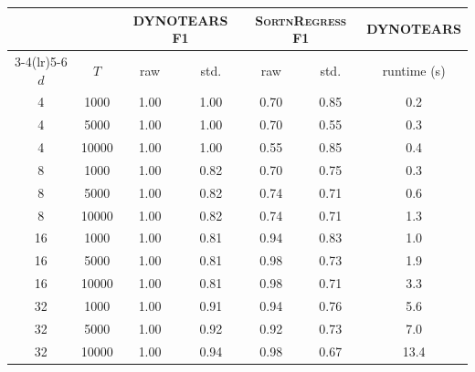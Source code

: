 \begin{tabular}{ccccccc}
\toprule
& & \multicolumn{2}{c}{DYNOTEARS F1} & \multicolumn{2}{c}{\textsc{SortnRegress} F1} & DYNOTEARS \\
\cmidrule(lr){3-4}\cmidrule(lr){5-6}
$d$ & $T$ & raw & std. & raw & std. & runtime (s) \\
\midrule
4 & 1000 & 1.00 & 1.00 & 0.70 & 0.85 & 0.2 \\
4 & 5000 & 1.00 & 1.00 & 0.70 & 0.55 & 0.3 \\
4 & 10000 & 1.00 & 1.00 & 0.55 & 0.85 & 0.4 \\
8 & 1000 & 1.00 & 0.82 & 0.70 & 0.75 & 0.3 \\
8 & 5000 & 1.00 & 0.82 & 0.74 & 0.71 & 0.6 \\
8 & 10000 & 1.00 & 0.82 & 0.74 & 0.71 & 1.3 \\
16 & 1000 & 1.00 & 0.81 & 0.94 & 0.83 & 1.0 \\
16 & 5000 & 1.00 & 0.81 & 0.98 & 0.73 & 1.9 \\
16 & 10000 & 1.00 & 0.81 & 0.98 & 0.71 & 3.3 \\
32 & 1000 & 1.00 & 0.91 & 0.94 & 0.76 & 5.6 \\
32 & 5000 & 1.00 & 0.92 & 0.92 & 0.73 & 7.0 \\
32 & 10000 & 1.00 & 0.94 & 0.98 & 0.67 & 13.4 \\
\bottomrule
\end{tabular}

